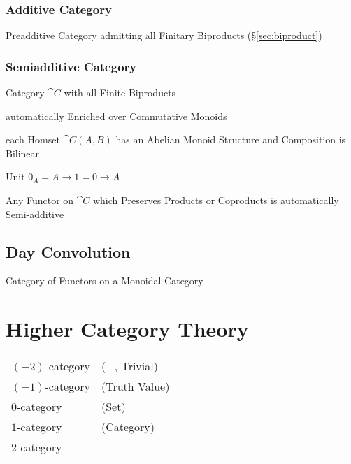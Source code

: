 \subsubsection{Additive Category}\label{sec:additive_category}

Preadditive Category admitting all Finitary Biproducts
(\S\ref{sec:biproduct})



\subsubsection{Semiadditive Category}\label{sec:semiadditive_category}

Category $\cat{C}$ with all Finite Biproducts

automatically Enriched over Commutative Monoids

each Homset $\cat{C}(A,B)$ has an Abelian Monoid Structure and
Composition is Bilinear

Unit $0_A = A \rightarrow 1 = 0 \rightarrow A$

Any Functor on $\cat{C}$ which Preserves Products or Coproducts is
automatically Semi-additive



\subsection{Day Convolution}\label{sec:day_convolution}


Category of Functors on a Monoidal Category



\section{Higher Category Theory}\label{sec:higher_category}

\begin{tabular}{l l}
  $(-2)$-category   & ($\top$, Trivial) \\
  $(-1)$-category   & (Truth Value) \\
  $0$-category      & (Set) \\
  $1$-category      & (Category) \\
  $2$-category      & \\
\end{tabular}

